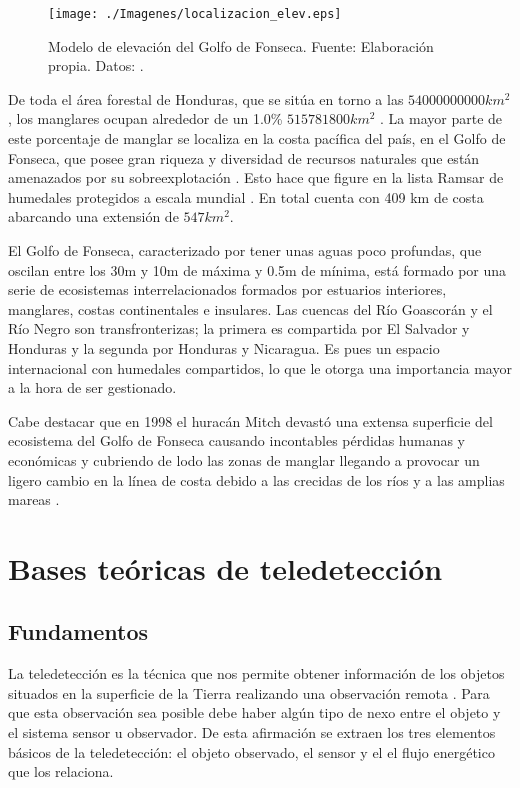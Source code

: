 \begin{figure}
	\centering
	\texttt{[image: ./Imagenes/localizacion\_elev.eps]}
	\caption[Modelo de elevación del Golfo de Fonseca]{Modelo de elevación del Golfo de Fonseca. Fuente: Elaboración propia. Datos: \cite{SRTM2008}.}
	\label{fig:elevacion}
\end{figure}

De toda el área forestal de Honduras, que se sitúa en torno a las $54000000000 km^{2}$, los manglares ocupan alrededor de un 1.0\% $515781800 km^{2}$ \citep{anuario2013}. La mayor parte de este porcentaje de manglar se localiza en la costa pacífica del país, en el Golfo de Fonseca, que posee gran riqueza y diversidad de recursos naturales que están amenazados por su sobreexplotación \citep{Jimenez1994}. Esto hace que figure en la lista Ramsar de humedales protegidos a escala mundial \citep{Ramsar2014}. En total cuenta con 409 km de costa abarcando una extensión de $547 km^{2}$.\Sep

El Golfo de Fonseca, caracterizado por tener unas aguas poco profundas, que oscilan entre los 30m y 10m de máxima y 0.5m de mínima, está formado por una serie de ecosistemas interrelacionados formados por estuarios interiores, manglares, costas continentales e insulares. Las cuencas del Río Goascorán y el Río Negro son transfronterizas; la primera es compartida por El Salvador y Honduras y la segunda por Honduras y Nicaragua. Es pues un espacio internacional con humedales compartidos, lo que le otorga una importancia mayor a la hora de ser gestionado.\Sep

Cabe destacar que en 1998 el huracán Mitch devastó una extensa superficie del ecosistema del Golfo de Fonseca causando incontables pérdidas humanas y económicas y cubriendo de lodo las zonas de manglar llegando a provocar un ligero cambio en la línea de costa debido a las crecidas de los ríos y a las amplias mareas \citep{mexico1999honduras}.

\section{Bases teóricas de teledetección} \label{sec:bases}
\subsection{Fundamentos} \label{subsec:fundamentos}
La teledetección es la técnica que nos permite obtener información de los objetos situados en la superficie de la Tierra realizando una observación remota \citep{Curran1991Longman} \citep{chuvieco2002teledeteccion} \citep{schowengerdt2006}. Para que esta observación sea posible debe haber algún tipo de nexo entre el objeto y el sistema sensor u observador. De esta afirmación se extraen los tres elementos básicos de la teledetección: el objeto observado, el sensor y el el flujo energético que los relaciona.\Sep

